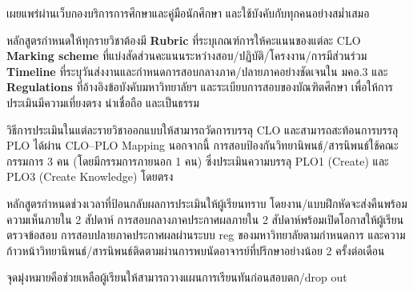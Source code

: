 เผยแพร่ผ่านเว็บกองบริการการศึกษาและคู่มือนักศึกษา และใช้บังคับกับทุกคนอย่างสม่ำเสมอ


หลักสูตรกำหนดให้ทุกรายวิชาต้องมี
\textbf{Rubric} ที่ระบุเกณฑ์การให้คะแนนของแต่ละ CLO \textbf{Marking scheme} ที่แบ่งสัดส่วนคะแนนระหว่างสอบ/ปฏิบัติ/โครงงาน/การมีส่วนร่วม \textbf{Timeline} ที่ระบุวันส่งงานและกำหนดการสอบกลางภาค/ปลายภาคอย่างชัดเจนใน มคอ.3 และ \textbf{Regulations} ที่อ้างอิงข้อบังคับมหาวิทยาลัยฯ และระเบียบการสอบของบัณฑิตศึกษา เพื่อให้การประเมินมีความเที่ยงตรง น่าเชื่อถือ และเป็นธรรม



วิธีการประเมินในแต่ละรายวิชาออกแบบให้สามารถวัดการบรรลุ CLO และสามารถสะท้อนการบรรลุ PLO ได้ผ่าน CLO--PLO Mapping นอกจากนี้ การสอบป้องกันวิทยานิพนธ์/สารนิพนธ์ใช้คณะกรรมการ 3 คน (โดยมีกรรมการภายนอก 1 คน) ซึ่งประเมินความบรรลุ PLO1 (Create) และ PLO3 (Create Knowledge) โดยตรง


หลักสูตรกำหนดช่วงเวลาที่ป้อนกลับผลการประเมินให้ผู้เรียนทราบ
โดยงาน/แบบฝึกหัดจะส่งคืนพร้อมความเห็นภายใน 2 สัปดาห์ การสอบกลางภาคประกาศผลภายใน 2 สัปดาห์พร้อมเปิดโอกาสให้ผู้เรียนตรวจข้อสอบ การสอบปลายภาคประกาศผลผ่านระบบ reg ของมหาวิทยาลัยตามกำหนดการ และความก้าวหน้าวิทยานิพนธ์/สารนิพนธ์ติดตามผ่านการพบนัดอาจารย์ที่ปรึกษาอย่างน้อย 2 ครั้งต่อเดือน

จุดมุ่งหมายคือช่วยเหลือผู้เรียนให้สามารถวางแผนการเรียนทันก่อนสอบตก/drop out


